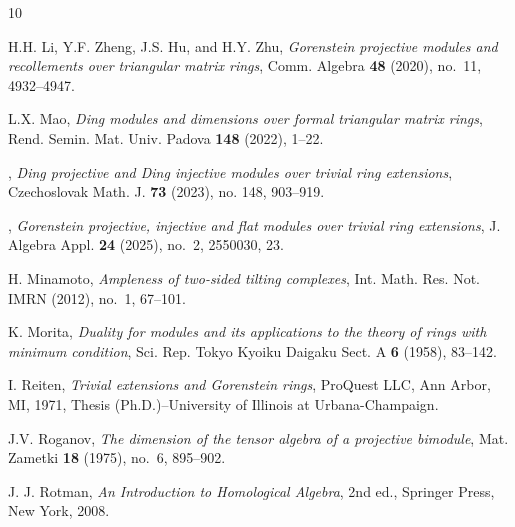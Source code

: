 \documentclass[10pt,twoside]{amsart}
\theoremstyle{bfupright head,slanted body}
\theoremstyle{bfupright head,upright body}
\theoremstyle{fixed bf head,slanted body}
\theoremstyle{fixed bf head,upright body}
\theoremstyle{numbered paragraph}
\numberwithin{equation}{res}
\begin{document}
\begin{thebibliography}{10}


H.H. Li, Y.F. Zheng, J.S. Hu, and H.Y. Zhu, \emph{Gorenstein
  projective modules and recollements over triangular matrix rings}, Comm.
  Algebra \textbf{48} (2020), no.~11, 4932--4947. %


L.X. Mao, \emph{Ding modules and dimensions over formal triangular matrix rings}, Rend. Semin. Mat. Univ. Padova {\bf 148} (2022), 1--22.

  
\bysame, \emph{Ding projective and Ding injective modules over trivial ring extensions}, Czechoslovak Math. J. {\bf 73} (2023), no. 148, 903--919.  

\bysame, \emph{Gorenstein projective, injective and flat modules over trivial
  ring extensions}, J. Algebra Appl. \textbf{24} (2025), no.~2, 2550030, 23. %

H. Minamoto, \emph{Ampleness of two-sided tilting complexes}, Int. Math.
  Res. Not. IMRN (2012), no.~1, 67--101. %

K. Morita, \emph{Duality for modules and its applications to the theory of
  rings with minimum condition}, Sci. Rep. Tokyo Kyoiku Daigaku Sect. A
  \textbf{6} (1958), 83--142. %

I. Reiten, \emph{Trivial extensions and Gorenstein rings}, ProQuest
  LLC, Ann Arbor, MI, 1971, Thesis (Ph.D.)--University of Illinois at
  Urbana-Champaign. %

J.V. Roganov, \emph{The dimension of the tensor algebra of a projective
  bimodule}, Mat. Zametki \textbf{18} (1975), no.~6, 895--902. %

J. J. Rotman,  \emph{An Introduction to Homological Algebra}, 2nd ed., Springer Press, New York, 2008.


\end{thebibliography}
\end{document}
